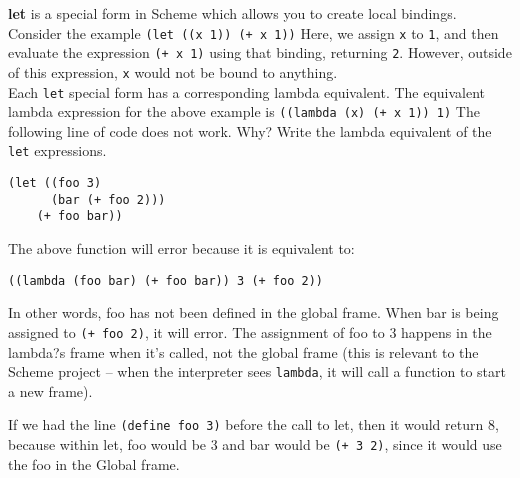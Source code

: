 \begin{blocksection}
\question
\textbf{let} is a special form in Scheme which allows you to create local bindings. Consider the example 
\newline
\newline
\texttt{(let ((x 1)) (+ x 1))}
\newline
\newline
Here, we assign \texttt{x} to \texttt{1}, and then evaluate the expression \texttt{(+ x 1)} using that binding, returning \texttt{2}. However, outside of this expression, \texttt{x} would not be bound to anything. \\
Each \texttt{let} special form has a corresponding lambda equivalent. The equivalent lambda expression for the above example is 
\newline
\newline
\texttt{((lambda (x) (+ x 1)) 1)}
\newline
\newline
The following line of code does not work. Why? Write the lambda
equivalent of the \texttt{let} expressions.

\begin{lstlisting}
(let ((foo 3)
      (bar (+ foo 2)))
    (+ foo bar))
\end{lstlisting}
\begin{solution}[0.5in]
The above function will error because it is equivalent to:
\begin{lstlisting}
((lambda (foo bar) (+ foo bar)) 3 (+ foo 2))
\end{lstlisting}

In other words, foo has not been defined in the global frame. When bar is being
assigned to \texttt{(+ foo 2)}, it will error. The assignment of foo to 3
happens in the lambda?s frame when it's called, not the global frame (this is
relevant to the Scheme project -- when the interpreter sees \texttt{lambda}, it
will call a function to start a new frame).

If we had the line \texttt{(define foo 3)} before the call to let, then it would
return 8, because within let, foo would be 3 and bar would be \texttt{(+ 3 2)},
since it would use the foo in the Global frame.
\end{solution}

\end{blocksection}